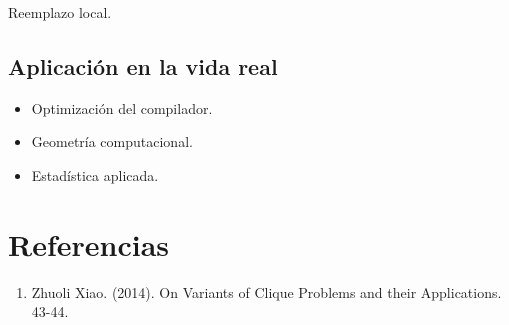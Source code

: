 \documentclass[a4paper]{article}
\begin{document}
Reemplazo local.

\subsection{Aplicación en la vida real}
\begin{itemize}
    \item Optimización del compilador.
    \item Geometría computacional.
    \item Estadística aplicada.
\end{itemize}

\newpage
\section{Referencias}
\noindent
\begin{enumerate}
    \item Zhuoli Xiao. (2014). On Variants of Clique Problems and their Applications. 43-44.
\end{enumerate}



%
\end{document}
